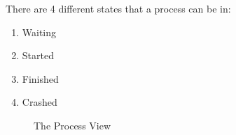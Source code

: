 There are 4 different states that a process can be in:
\begin{enumerate}
\item{Waiting}
\item{Started}
\item{Finished}
\item{Crashed}
\end{enumerate}

\begin{figure}[h]
\caption{ The Process View}
\label{fig:and_process_man}
\end{figure}
\FloatBarrier






